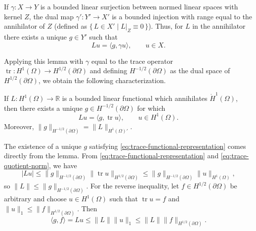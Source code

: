 \begin{Lemma}\label{lem:dual-surjection-annihilator}
{If $\gamma:X\to Y$ is a bounded linear surjection between normed linear spaces with kernel $Z$, the dual map $\gamma':Y'\to X'$ is a bounded injection with range equal to the annihilator of $Z$ (defined as $\{\,L\in X'\mid L|_Z\equiv0\,\}$). Thus, for $L$ in the annihilator there exists a unique $g\in Y'$ such that}
\[
Lu=\langle g,\gamma u\rangle,\qquad u\in X.
\]
\end{Lemma}

{Applying this lemma with $\gamma$ equal to the trace operator $\operatorname{tr}:H^1(\Omega)\to H^{1/2}(\partial\Omega)$ and defining $H^{-1/2}(\partial\Omega)$ as the dual space of $H^{1/2}(\partial\Omega)$, we obtain the following characterization.}

\begin{Proposition}\label{prop:trace-functional-representation}
{If $L:H^1(\Omega)\to\mathbb R$ is a bounded linear functional which annihilates $\mathring H^1(\Omega)$, then there exists a unique $g\in H^{-1/2}(\partial\Omega)$ for which}
\begin{equation}\label{eq:trace-functional-representation}
Lu=\langle g,\operatorname{tr}u\rangle,\qquad u\in H^1(\Omega).
\end{equation}
{Moreover, $\|g\|_{H^{-1/2}(\partial\Omega)}=\|L\|_{H^1(\Omega)'}$.}
\end{Proposition}

\begin{Proof}
{The existence of a unique $g$ satisfying \eqref{eq:trace-functional-representation} comes directly from the lemma. From \eqref{eq:trace-functional-representation} and \eqref{eq:trace-quotient-norm}, we have}
\[
|Lu|\leq\|g\|_{H^{-1/2}(\partial\Omega)}\|\operatorname{tr}u\|_{H^{1/2}(\partial\Omega)}\leq\|g\|_{H^{-1/2}(\partial\Omega)}\|u\|_{H^1(\Omega)},
\]
{so $\|L\|\leq\|g\|_{H^{-1/2}(\partial\Omega)}$. For the reverse inequality, let $f\in H^{1/2}(\partial\Omega)$ be arbitrary and choose $u\in H^1(\Omega)$ such that $\operatorname{tr}u=f$ and $\|u\|_1\leq\|f\|_{H^{1/2}(\partial\Omega)}$. Then}
\[
\langle g,f\rangle=Lu\leq\|L\|\|u\|_1\leq\|L\|\|f\|_{H^{1/2}(\partial\Omega)}.
\]
\end{Proof}

